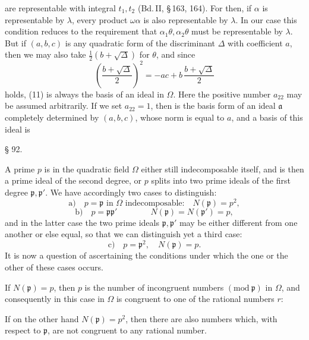 are representable with integral $t_1, t_2$ (Bd.\,II, §\,163, 164). For
then, if $\alpha$ is representable by $\lambda$, every product $\omega\alpha$ is
also representable by $\lambda$. In our case this condition reduces to the requirement that $\alpha_1\theta, \alpha_2\theta$ must be representable by $\lambda$. But if
$(a, b, c)$ is any quadratic form of the discriminant $\Delta$
with  coefficient $a$, then we may also take
$\tfrac12(b+\sqrt{\Delta})$ for $\theta$, and since
\[
\left(\frac{b+\sqrt{\Delta}}{2}\right)^2 = -ac + b\,\frac{b+\sqrt{\Delta}}{2}
\]
holds, (11) is always the basis of an ideal in $\Omega$. Here
the positive number $a_{22}$ may be assumed arbitrarily. If we set
$a_{22} = 1$, then
is the basis form of an ideal $\mathfrak{a}$ completely determined by $(a, b, c)$, whose
norm is equal to $a$, and a basis of this ideal is

\begin{center}
§ 92. 
\end{center}

A prime $p$ is in the quadratic field $\Omega$ either
still indecomposable itself, and is then a prime ideal of the second
degree, or $p$ splits into two prime ideals of the first degree $\mathfrak{p}, \mathfrak{p}'$.
We have accordingly two cases to distinguish:
\[
\text{a)}\quad p = \mathfrak{p} \text{ in } \Omega \text{ indecomposable:}\quad N(\mathfrak{p}) = p^2,
\]
\[
\text{b)}\quad p = \mathfrak{p}\mathfrak{p}' \qquad\qquad N(\mathfrak{p}) = N(\mathfrak{p}') = p,
\]
and in the latter case the two prime ideals $\mathfrak{p}, \mathfrak{p}'$ may be either
different from one another or else equal, so that we can distinguish
yet a third case:
\[
\text{c)}\quad p = \mathfrak{p}^2,\quad N(\mathfrak{p}) = p.
\]
It is now a question of ascertaining the conditions
under which the one or the other of these cases occurs.

If $N(\mathfrak{p}) = p$, then $p$ is the number of incongruent
numbers $(\mathrm{mod}\ \mathfrak{p})$ in $\Omega$, and consequently in this case 
in $\Omega$ is congruent to one of the rational numbers $r$:

If on the other hand $N(\mathfrak{p}) = p^2$, then there are also numbers which,
with respect to $\mathfrak{p}$, are not congruent to any rational number.
